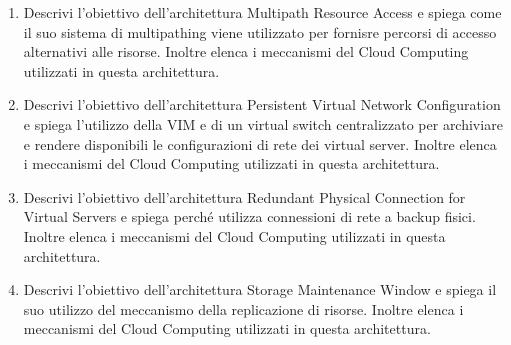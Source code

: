 \begin{enumerate}
    \item Descrivi l'obiettivo dell'architettura Multipath Resource Access e spiega come il suo sistema di multipathing viene utilizzato per fornisre percorsi di accesso alternativi alle risorse. Inoltre elenca i meccanismi del Cloud Computing utilizzati in questa architettura.
    \item Descrivi l'obiettivo dell'architettura Persistent Virtual Network Configuration e spiega l'utilizzo della VIM e di un virtual switch centralizzato per archiviare e rendere disponibili le configurazioni di rete dei virtual server. Inoltre elenca i meccanismi del Cloud Computing utilizzati in questa architettura.
    \item Descrivi l'obiettivo dell'architettura Redundant Physical Connection for Virtual Servers e spiega perché utilizza connessioni di rete a backup fisici. Inoltre elenca i meccanismi del Cloud Computing utilizzati in questa architettura.
    \item Descrivi l'obiettivo dell'architettura Storage Maintenance Window e spiega il suo utilizzo del meccanismo della replicazione di risorse. Inoltre elenca i meccanismi del Cloud Computing utilizzati in questa architettura.
\end{enumerate}
 